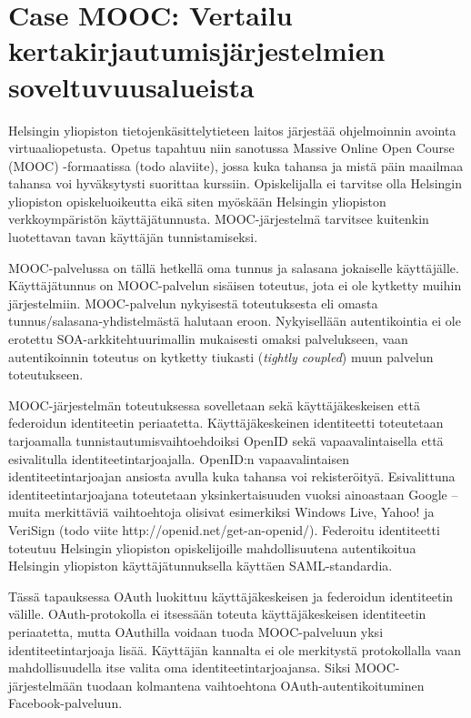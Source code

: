 \documentclass[finnish,gradu]{tktltiki}
\begin{document}




\section{Case MOOC: Vertailu kertakirjautumisjärjestelmien soveltuvuusalueista} %
\label{sec:mooc_vertailu}

  Helsingin yliopiston tietojenkäsittelytieteen laitos järjestää ohjelmoinnin avointa virtuaaliopetusta. Opetus tapahtuu niin sanotussa Massive Online Open Course (MOOC) -formaatissa (todo alaviite), jossa kuka tahansa ja mistä päin maailmaa tahansa voi hyväksytysti suorittaa kurssiin. Opiskelijalla ei tarvitse olla Helsingin yliopiston opiskeluoikeutta eikä siten myöskään Helsingin yliopiston verkkoympäristön käyttäjätunnusta. MOOC-järjestelmä tarvitsee kuitenkin luotettavan tavan käyttäjän tunnistamiseksi.

  MOOC-palvelussa on tällä hetkellä oma tunnus ja salasana jokaiselle käyttäjälle. Käyttäjätunnus on MOOC-palvelun sisäisen toteutus, jota ei ole kytketty muihin järjestelmiin. MOOC-palvelun nykyisestä toteutuksesta eli omasta tunnus/salasana-yhdistelmästä halutaan eroon. Nykyisellään autentikointia ei ole erotettu SOA-arkkitehtuurimallin mukaisesti omaksi palvelukseen, vaan autentikoinnin toteutus on kytketty tiukasti (\emph{tightly coupled}) muun palvelun toteutukseen.

  MOOC-järjestelmän toteutuksessa sovelletaan sekä käyttäjäkeskeisen että federoidun identiteetin periaatetta. Käyttäjäkeskeinen identiteetti toteutetaan tarjoamalla tunnistautumisvaihtoehdoiksi OpenID sekä vapaavalintaisella että esivalitulla identiteetintarjoajalla. OpenID:n vapaavalintaisen identiteetintarjoajan ansiosta avulla kuka tahansa voi rekisteröityä. Esivalittuna identiteetintarjoajana toteutetaan yksinkertaisuuden vuoksi ainoastaan Google -- muita merkittäviä vaihtoehtoja olisivat esimerkiksi Windows Live, Yahoo! ja VeriSign (todo viite http://openid.net/get-an-openid/). Federoitu identiteetti toteutuu Helsingin yliopiston opiskelijoille mahdollisuutena autentikoitua Helsingin yliopiston käyttäjätunnuksella käyttäen SAML-standardia.

  Tässä tapauksessa OAuth luokittuu käyttäjäkeskeisen ja federoidun identiteetin välille. OAuth-protokolla ei itsessään toteuta käyttäjäkeskeisen identiteetin periaatetta, mutta OAuthilla voidaan tuoda MOOC-palveluun yksi identiteetintarjoaja lisää. Käyttäjän kannalta ei ole merkitystä protokollalla vaan mahdollisuudella itse valita oma identiteetintarjoajansa. Siksi MOOC-järjestelmään tuodaan kolmantena vaihtoehtona OAuth-autentikoituminen Facebook-palveluun.
\end{document}
